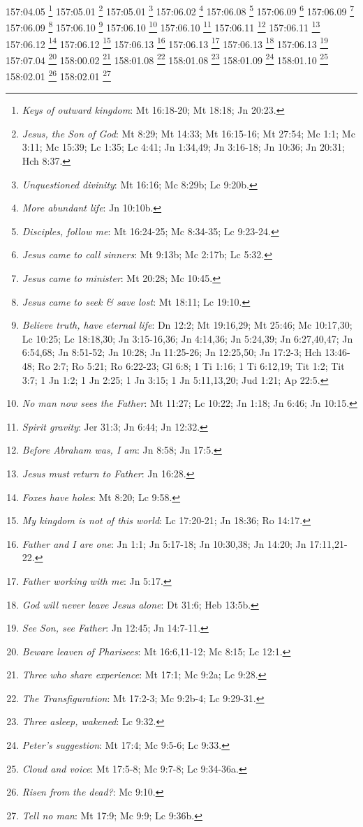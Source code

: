 {{{{{{{{{{{{{{{{{{{{{{{{{{{{{{{{{{{157:04.05 \footnote{\textit{Keys of outward kingdom}: Mt 16:18-20; Mt 18:18; Jn 20:23.}
157:05.01 \footnote{\textit{Jesus, the Son of God}: Mt 8:29; Mt 14:33; Mt 16:15-16; Mt 27:54; Mc 1:1; Mc 3:11; Mc 15:39; Lc 1:35; Lc 4:41; Jn 1:34,49; Jn 3:16-18; Jn 10:36; Jn 20:31; Hch 8:37.}
157:05.01 \footnote{\textit{Unquestioned divinity}: Mt 16:16; Mc 8:29b; Lc 9:20b.}
157:06.02 \footnote{\textit{More abundant life}: Jn 10:10b.}
157:06.08 \footnote{\textit{Disciples, follow me}: Mt 16:24-25; Mc 8:34-35; Lc 9:23-24.}
157:06.09 \footnote{\textit{Jesus came to call sinners}: Mt 9:13b; Mc 2:17b; Lc 5:32.}
157:06.09 \footnote{\textit{Jesus came to minister}: Mt 20:28; Mc 10:45.}
157:06.09 \footnote{\textit{Jesus came to seek & save lost}: Mt 18:11; Lc 19:10.}
157:06.10 \footnote{\textit{Believe truth, have eternal life}: Dn 12:2; Mt 19:16,29; Mt 25:46; Mc 10:17,30; Lc 10:25; Lc 18:18,30; Jn 3:15-16,36; Jn 4:14,36; Jn 5:24,39; Jn 6:27,40,47; Jn 6:54,68; Jn 8:51-52; Jn 10:28; Jn 11:25-26; Jn 12:25,50; Jn 17:2-3; Hch 13:46-48; Ro 2:7; Ro 5:21; Ro 6:22-23; Gl 6:8; 1 Ti 1:16; 1 Ti 6:12,19; Tit 1:2; Tit 3:7; 1 Jn 1:2; 1 Jn 2:25; 1 Jn 3:15; 1 Jn 5:11,13,20; Jud 1:21; Ap 22:5.}
157:06.10 \footnote{\textit{No man now sees the Father}: Mt 11:27; Lc 10:22; Jn 1:18; Jn 6:46; Jn 10:15.}
157:06.10 \footnote{\textit{Spirit gravity}: Jer 31:3; Jn 6:44; Jn 12:32.}
157:06.11 \footnote{\textit{Before Abraham was, I am}: Jn 8:58; Jn 17:5.}
157:06.11 \footnote{\textit{Jesus must return to Father}: Jn 16:28.}
157:06.12 \footnote{\textit{Foxes have holes}: Mt 8:20; Lc 9:58.}
157:06.12 \footnote{\textit{My kingdom is not of this world}: Lc 17:20-21; Jn 18:36; Ro 14:17.}
157:06.13 \footnote{\textit{Father and I are one}: Jn 1:1; Jn 5:17-18; Jn 10:30,38; Jn 14:20; Jn 17:11,21-22.}
157:06.13 \footnote{\textit{Father working with me}: Jn 5:17.}
157:06.13 \footnote{\textit{God will never leave Jesus alone}: Dt 31:6; Heb 13:5b.}
157:06.13 \footnote{\textit{See Son, see Father}: Jn 12:45; Jn 14:7-11.}
157:07.04 \footnote{\textit{Beware leaven of Pharisees}: Mt 16:6,11-12; Mc 8:15; Lc 12:1.}
158:00.02 \footnote{\textit{Three who share experience}: Mt 17:1; Mc 9:2a; Lc 9:28.}
158:01.08 \footnote{\textit{The Transfiguration}: Mt 17:2-3; Mc 9:2b-4; Lc 9:29-31.}
158:01.08 \footnote{\textit{Three asleep, wakened}: Lc 9:32.}
158:01.09 \footnote{\textit{Peter's suggestion}: Mt 17:4; Mc 9:5-6; Lc 9:33.}
158:01.10 \footnote{\textit{Cloud and voice}: Mt 17:5-8; Mc 9:7-8; Lc 9:34-36a.}
158:02.01 \footnote{\textit{Risen from the dead?}: Mc 9:10.}
158:02.01 \footnote{\textit{Tell no man}: Mt 17:9; Mc 9:9; Lc 9:36b.}
}}}}}}}}}}}}}}}}}}}}}}}}}}}}}}}}}}}
